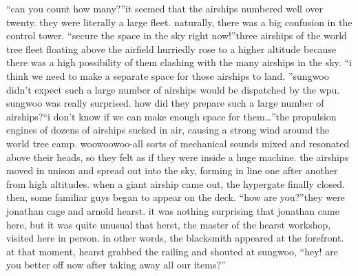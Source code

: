 “can you count how many?”it seemed that the airships numbered well over twenty.
 they were literally a large fleet.
naturally, there was a big confusion in the control tower.
“secure the space in the sky right now!”three airships of the world tree fleet floating above the airfield hurriedly rose to a higher altitude because there was a high possibility of them clashing with the many airships in the sky.
“i think we need to make a separate space for those airships to land.
”sungwoo didn’t expect such a large number of airships would be dispatched by the wpu.
 sungwoo was really surprised.
 how did they prepare such a large number of airships?“i don’t know if we can make enough space for them…”the propulsion engines of dozens of airships sucked in air, causing a strong wind around the world tree camp.
woowoowoo-all sorts of mechanical sounds mixed and resonated above their heads, so they felt as if they were inside a huge machine.
the airships moved in unison and spread out into the sky, forming in line one after another from high altitudes.
 when a giant airship came out, the hypergate finally closed.
 then, some familiar guys began to appear on the deck.
“how are you?”they were jonathan cage and arnold hearst.
 it was nothing surprising that jonathan came here, but it was quite unusual that herst, the master of the hearst workshop, visited here in person.
 in other words, the blacksmith appeared at the forefront.
at that moment, hearst grabbed the railing and shouted at sungwoo, “hey! are you better off now after taking away all our items?”

 